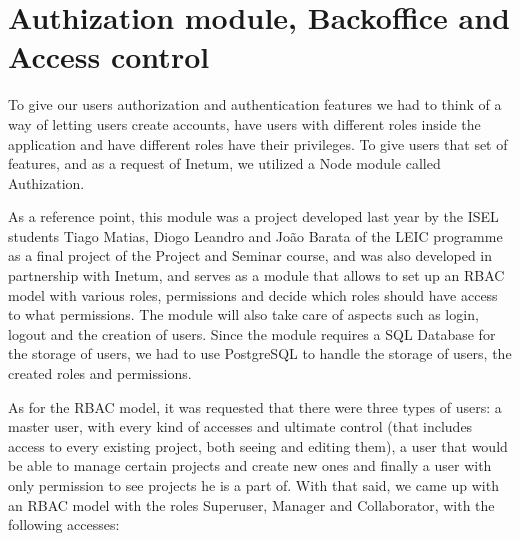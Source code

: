 \documentclass[a4paper,twoside,10pt]{report}
\begin{document}
\newpage
\section{Authization module, Backoffice and Access control}
 To give our users authorization and authentication features we had to think of a way of letting users create accounts, have users with different roles inside the application and have different roles have their privileges. To give users that set of features, and as a request of Inetum, we utilized a Node module called Authization\cite{AUTHIZATION}. 

As a reference point, this module was a project developed last year by the ISEL students Tiago Matias, Diogo Leandro and João Barata of the LEIC programme as a final project of the Project and Seminar course, and was also developed in partnership with Inetum, and serves as a module that allows to set up an RBAC model with various roles, permissions and decide which roles should have access to what permissions. The module will also take care of aspects such as login, logout and the creation of users. Since the module requires a SQL Database for the storage of users, we had to use  PostgreSQL\cite{POSTGRESQL} to handle the storage of users, the created roles and permissions.

As for the RBAC model, it was requested that there were three types of users: a master user, with every kind of accesses and ultimate control (that includes access to every existing project, both seeing and editing them), a user that would be able to manage certain projects and create new ones and finally a user with only permission to see projects he is a part of.
With that said, we came up with an RBAC model with the roles Superuser, Manager and Collaborator, with the following accesses:
 
\end{document}

